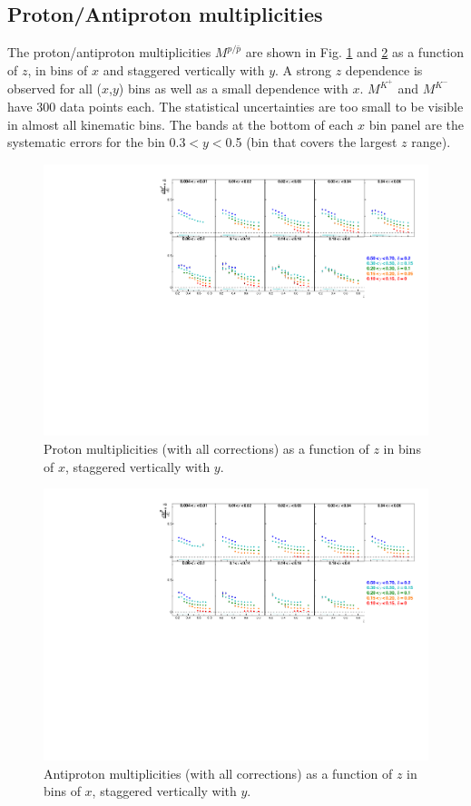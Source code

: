 \newpage

\subsection{Proton/Antiproton multiplicities}

The proton/antiproton multiplicities $M^{p/\bar{p}}$ are shown in Fig. \ref{pic:mpp} and \ref{pic:mpm} as a function of $z$, in bins of $x$ and staggered vertically with $y$. A strong $z$ dependence is observed for all ($x$,$y$) bins as well as a small dependence with $x$. $M^{K^+}$ and $M^{K^-}$ have 300 data points each. The statistical uncertainties are too small to be visible in almost all kinematic bins. The bands at the bottom of each $x$ bin panel are the systematic errors for the bin 0.3$< y <$0.5 (bin that covers the largest $z$ range).

\begin{figure}[!h]
  \centering
	\includegraphics[scale=0.85]{./gfx/pp.pdf}
	\caption{Proton multiplicities (with all corrections) as a function of $z$ in bins of $x$, staggered vertically with $y$.}
	\label{pic:mpp}
\end{figure}

\begin{figure}[!h]
  \centering
	\includegraphics[scale=0.85]{./gfx/pm.pdf}
	\caption{Antiproton multiplicities (with all corrections) as a function of $z$ in bins of $x$, staggered vertically with $y$.}
	\label{pic:mpm}
\end{figure}

